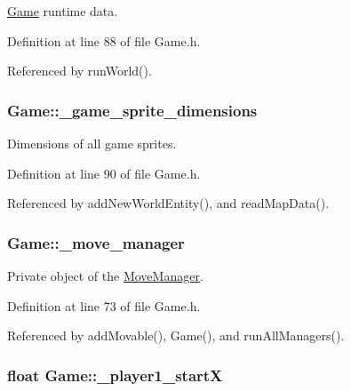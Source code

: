 \hyperlink{classGame}{Game} runtime data. 



Definition at line 88 of file Game.\-h.



Referenced by run\-World().

\hypertarget{classGame_a142a0a8783ff5de45f0377973ab5415a}{
\subsubsection[{\-\_\-game\-\_\-sprite\-\_\-dimensions}]{ Game\-::\-\_\-game\-\_\-sprite\-\_\-dimensions\hspace{0.3cm}{\ttfamily [private]}}}\label{classGame_a142a0a8783ff5de45f0377973ab5415a}


Dimensions of all game sprites. 



Definition at line 90 of file Game.\-h.



Referenced by add\-New\-World\-Entity(), and read\-Map\-Data().

\hypertarget{classGame_a2998c8ca6b641f19bca912c1aba2d54f}{
\subsubsection[{\-\_\-move\-\_\-manager}]{ Game\-::\-\_\-move\-\_\-manager\hspace{0.3cm}{\ttfamily [private]}}}\label{classGame_a2998c8ca6b641f19bca912c1aba2d54f}


Private object of the \hyperlink{classMoveManager}{Move\-Manager}. 



Definition at line 73 of file Game.\-h.



Referenced by add\-Movable(), Game(), and run\-All\-Managers().

\hypertarget{classGame_ac3d9582803715a82b0aa03ddc9d9b7f6}{
\subsubsection[{\-\_\-player1\-\_\-start\-X}]{\setlength{\rightskip}{0pt plus 5cm}float Game\-::\-\_\-player1\-\_\-start\-X\hspace{0.3cm}{\ttfamily [private]}}}\label{classGame_ac3d9582803715a82b0aa03ddc9d9b7f6}


